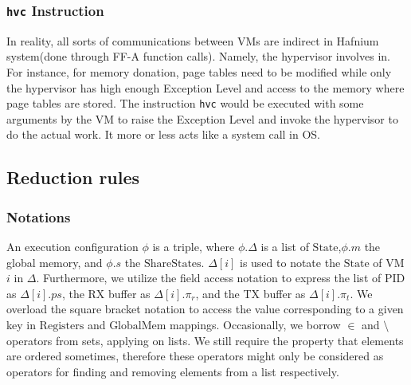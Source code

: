\documentclass[a4paper]{article}
\newcommand*{\STATE}{\text{State}}
\newcommand*{\MEM}{\text{GlobalMem}}
\newcommand*{\SSS}{\text{ShareStates}}
\newcommand*{\PID}{\text{PID}}
\newcommand*{\REGS}{\text{Registers}}
\newcommand*{\instr}[1]{\texttt{#1}}
\begin{document}
\subsubsection{\instr{hvc} Instruction}
In reality, all sorts of communications
between VMs are indirect in Hafnium system(done through FF-A function calls).
Namely, the hypervisor involves in. For instance, for memory donation, page
tables need to be modified while only the hypervisor has high enough Exception
Level and access to the memory where page tables are stored. The instruction
\texttt{hvc} would be executed with some arguments by the VM to raise the
Exception Level and invoke the hypervisor to do the actual work. It more or less
acts like a system call in OS.




\subsection{Reduction rules}
\subsubsection{Notations}
An execution configuration $\phi$ is a triple, where $\phi.\Delta$
is a list of $\STATE$,$\phi.m$ the global memory, and $\phi.s$ the $\SSS$. $\Delta[i]$ is used
to notate the $\STATE$ of VM $i$ in $\Delta$. Furthermore, we utilize the field
access notation to express the list of $\PID$ as $\Delta[i].ps$, the RX buffer as $\Delta[i].\pi_{r}$,
and the TX buffer as $\Delta[i].\pi_{t}$.
We overload the square bracket notation to access
the value corresponding to a given key in $\REGS$ and $\MEM$ mappings. Occasionally, we
borrow $\in$ and $\setminus$ operators from sets, applying on lists. We still require
the property that elements are ordered sometimes, therefore these
operators might only be considered as operators for finding
and removing elements from a list respectively.

\end{document}
